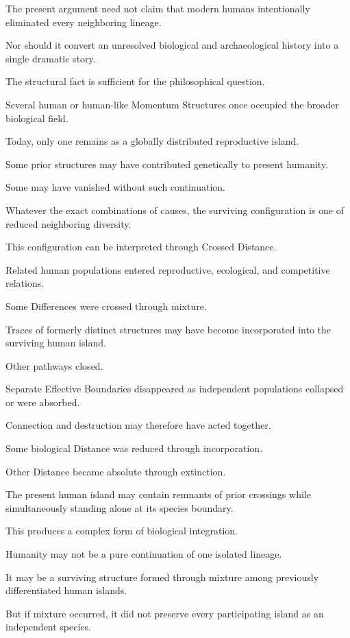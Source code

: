 The present argument need not claim that modern humans intentionally eliminated every neighboring lineage.

Nor should it convert an unresolved biological and archaeological history into a single dramatic story.

The structural fact is sufficient for the philosophical question.

Several human or human-like Momentum Structures once occupied the broader biological field.

Today, only one remains as a globally distributed reproductive island.

Some prior structures may have contributed genetically to present humanity.

Some may have vanished without such continuation.

Whatever the exact combinations of causes, the surviving configuration is one of reduced neighboring diversity.

This configuration can be interpreted through Crossed Distance.

Related human populations entered reproductive, ecological, and competitive relations.

Some Differences were crossed through mixture.

Traces of formerly distinct structures may have become incorporated into the surviving human island.

Other pathways closed.

Separate Effective Boundaries disappeared as independent populations collapsed or were absorbed.

Connection and destruction may therefore have acted together.

Some biological Distance was reduced through incorporation.

Other Distance became absolute through extinction.

The present human island may contain remnants of prior crossings while simultaneously standing alone at its species boundary.

This produces a complex form of biological integration.

Humanity may not be a pure continuation of one isolated lineage.

It may be a surviving structure formed through mixture among previously differentiated human islands.

But if mixture occurred, it did not preserve every participating island as an independent species.

